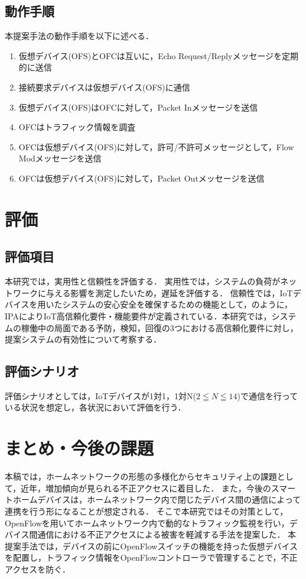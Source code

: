 \documentclass[a4paper,10pt,twocolumn,uplatex]{jsarticle}
\begin{document}
\subsection{動作手順}
本提案手法の動作手順を以下に述べる．

\begin{enumerate}
  \item 仮想デバイス(OFS)とOFCは互いに，Echo Request/Replyメッセージを定期的に送信
  \item 接続要求デバイスは仮想デバイス(OFS)に通信
  \item 仮想デバイス(OFS)はOFCに対して，Packet Inメッセージを送信
  \item OFCはトラフィック情報を調査
  \item OFCは仮想デバイス(OFS)に対して，許可/不許可メッセージとして，Flow Modメッセージを送信
  \item OFCは仮想デバイス(OFS)に対して，Packet Outメッセージを送信
\end{enumerate}

\section{評価}
\subsection{評価項目}
本研究では，実用性と信頼性を評価する．
実用性では，システムの負荷がネットワークに与える影響を測定したいため，遅延を評価する．
信頼性では，IoTデバイスを用いたシステムの安心安全を確保するための機能として，のように，IPAによりIoT高信頼化要件・機能要件が定義されている．本研究では，システムの稼働中の局面である予防，検知，回復の3つにおける高信頼化要件に対し，提案システムの有効性について考察する．


\subsection{評価シナリオ}
評価シナリオとしては，IoTデバイスが1対1，1対N($2\leqq N \leqq 14$)で通信を行っている状況を想定し，各状況において評価を行う．

\section{まとめ・今後の課題}
本稿では，ホームネットワークの形態の多様化からセキュリティ上の課題として，近年，増加傾向が見られる不正アクセスに着目した．
また，今後のスマートホームデバイスは，ホームネットワーク内で閉じたデバイス間の通信によって連携を行う形になることが想定される．
そこで本研究ではその対策として，OpenFlowを用いてホームネットワーク内で動的なトラフィック監視を行い，デバイス間通信における不正アクセスによる被害を軽減する手法を提案した．
本提案手法では，デバイスの前にOpenFlowスイッチの機能を持った仮想デバイスを配置し，トラフィック情報をOpenFlowコントローラで管理することで，不正アクセスを防ぐ．
\end{document}
